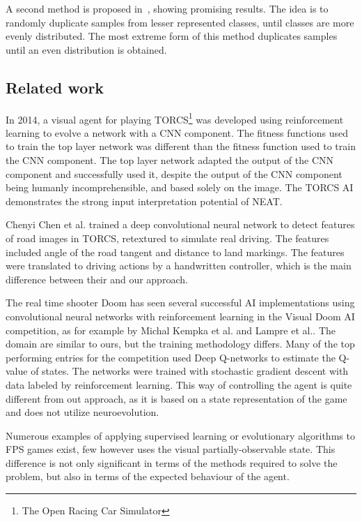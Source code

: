 A second method is proposed in~\cite{balanced-classes}, showing promising results. The idea is to randomly duplicate samples from lesser represented classes, until classes are more evenly distributed. The most extreme form of this method duplicates samples until an even distribution is obtained.
\subsection{Related work}
\label{sec:relatedwork}
In 2014, a visual agent for playing TORCS\footnote{The Open Racing Car Simulator} was developed using reinforcement learning to evolve a network with a CNN component\cite{torcs}. The fitness functions used to train the top layer network was different than the fitness function used to train the CNN component. The top layer network adapted the output of the CNN component and successfully used it, despite the output of the CNN component being humanly incomprehensible, and based solely on the image. The TORCS AI demonstrates the strong input interpretation potential of NEAT.

Chenyi Chen et al. \cite{chen} trained a deep convolutional neural network to detect features of road images in TORCS, retextured to simulate real driving. The features included angle of the road tangent and distance to land markings. The features were translated to driving actions by a handwritten controller, which is the main difference between their and our approach.

The real time shooter Doom has seen several successful AI implementations using convolutional neural networks with reinforcement learning in the Visual Doom AI competition, as for example by Michal Kempka et al.\cite{vizdoom} and Lampre et al.\cite{DBLP:journals/corr/LampleC16}. The domain are similar to ours, but the training methodology differs. Many of the top performing entries for the competition used Deep Q-networks to estimate the Q-value of states. The networks were trained with stochastic gradient descent with data labeled by reinforcement learning. This way of controlling the agent is quite different from out approach, as it is based on a state representation of the game and does not utilize neuroevolution.

Numerous examples of applying supervised learning or evolutionary algorithms to FPS games exist\cite{benjamin}\cite{silvano}, few however uses the visual partially-observable state. This difference is not only significant in terms of the methods required to solve the problem, but also in terms of the expected behaviour of the agent.

